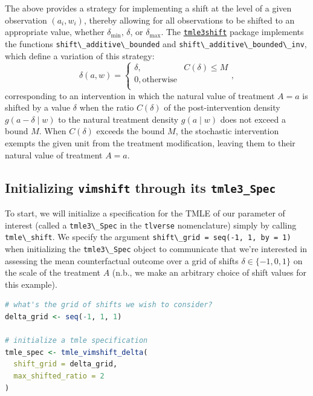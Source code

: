 \documentclass[
  12pt, krantz2,
]{krantz}
\newcommand{\passthrough}[1]{#1}
\newcommand{\1}{\mathbbm{1}}
\theoremstyle{definition}
\theoremstyle{definition}
\theoremstyle{definition}
\theoremstyle{definition}
\theoremstyle{remark}
\begin{document}
The above provides a strategy for implementing a shift at the level of a given
observation \((a_i, w_i)\), thereby allowing for all observations to be shifted to
an appropriate value, whether \(\delta_{\text{min}}\), \(\delta\), or
\(\delta_{\text{max}}\). The \href{https://github.com/tlverse/tmle3shift}{\passthrough{\lstinline!tmle3shift!}}
package implements the functions \passthrough{\lstinline!shift\_additive\_bounded!} and
\passthrough{\lstinline!shift\_additive\_bounded\_inv!}, which define a variation of this strategy:
\begin{equation}
  \delta(a, w) =
    \begin{cases}
      \delta, & C(\delta) \leq M \\
      0, \text{otherwise} \\
    \end{cases},
  \label{eq:shift-bounded-simple}
\end{equation}
corresponding to an intervention in which the natural value of treatment \(A = a\)
is shifted by a value \(\delta\) when the ratio \(C(\delta)\) of the
post-intervention density \(g(a - \delta \mid w)\) to the natural treatment
density \(g(a \mid w)\) does not exceed a bound \(M\). When \(C(\delta)\) exceeds the
bound \(M\), the stochastic intervention exempts the given unit from the treatment
modification, leaving them to their natural value of treatment \(A = a\).

\hypertarget{initializing-vimshift-through-its-tmle3_spec}{%
\subsection{\texorpdfstring{Initializing \texttt{vimshift} through its \texttt{tmle3\_Spec}}{Initializing vimshift through its tmle3\_Spec}}\label{initializing-vimshift-through-its-tmle3_spec}}

To start, we will initialize a specification for the TMLE of our parameter of
interest (called a \passthrough{\lstinline!tmle3\_Spec!} in the \passthrough{\lstinline!tlverse!} nomenclature) simply by calling
\passthrough{\lstinline!tmle\_shift!}. We specify the argument \passthrough{\lstinline!shift\_grid = seq(-1, 1, by = 1)!}
when initializing the \passthrough{\lstinline!tmle3\_Spec!} object to communicate that we're interested
in assessing the mean counterfactual outcome over a grid of shifts \(\delta \in \{-1, 0, 1\}\) on the scale of the treatment \(A\) (n.b., we make an arbitrary
choice of shift values for this example).

\begin{lstlisting}[language=R]
# what's the grid of shifts we wish to consider?
delta_grid <- seq(-1, 1, 1)

# initialize a tmle specification
tmle_spec <- tmle_vimshift_delta(
  shift_grid = delta_grid,
  max_shifted_ratio = 2
)
\end{lstlisting}
\end{document}
